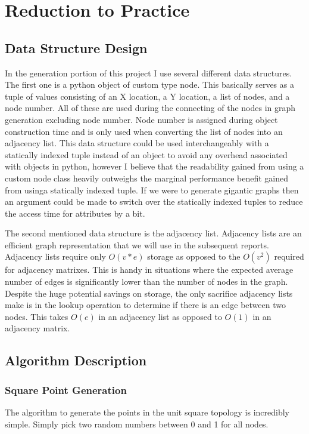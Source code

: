 \documentclass{article}
\begin{document}
  \section{Reduction to Practice}
	  \subsection{Data Structure Design}
  In the generation portion of this project I use several different data structures.
  The first one is a python object of custom type node.
  This basically serves as a tuple of values consisting of an X location, a Y location, a list of nodes, and a node number.
  All of these are used during the connecting of the nodes in graph generation excluding node number.
  Node number is assigned during object construction time and is only used when converting the list of nodes into an adjacency list.
	This data structure could be used interchangeably with a statically indexed tuple instead of an object to avoid any overhead associated with objects in python, however I believe that the readability gained from using a custom node class heavily outweighs the marginal performance benefit gained from usinga  statically indexed tuple.
	If we were to generate gigantic graphs then an argument could be made to switch over the statically indexed tuples to reduce the access time for attributes by a bit.

  The second mentioned data structure is the adjacency list.
  Adjacency lists are an efficient graph representation that we will use in the subsequent reports.
  Adjacency lists require only $O(v*e)$ storage as opposed to the $O(v^2)$ required for adjacency matrixes.
  This is handy in situations where the expected average number of edges is significantly lower than the number of nodes in the graph.
  Despite the huge potential savings on storage, the only sacrifice adjacency lists make is in the lookup operation to determine if there is an edge between two nodes.
  This takes $O(e)$ in an adjacency list as opposed to $O(1)$ in an adjacency matrix.
	\subsection{Algorithm Description}
  \subsubsection{Square Point Generation}
  The algorithm to generate the points in the unit square topology is incredibly simple.
  Simply pick two random numbers between 0 and 1 for all nodes.
\end{document}
